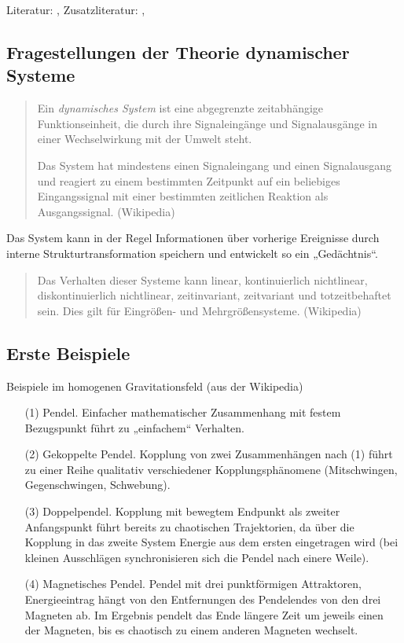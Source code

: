 \documentclass[11pt,a4paper]{article}
\begin{document}
Literatur: \cite{Prigogine1993}, Zusatzliteratur: \cite{Jantsch1992},
\cite{Jooss2017}

\subsection{Fragestellungen der Theorie dynamischer Systeme}
\begin{quote}  
  Ein \emph{dynamisches System} ist eine abgegrenzte zeitabhängige
  Funktionseinheit, die durch ihre Signaleingänge und Signalausgänge in einer
  Wechselwirkung mit der Umwelt steht. 

  Das System hat mindestens einen Signaleingang und einen Signalausgang und
  reagiert zu einem bestimmten Zeitpunkt auf ein beliebiges Eingangssignal mit
  einer bestimmten zeitlichen Reaktion als Ausgangssignal. (Wikipedia)
\end{quote}
Das System kann in der Regel Informationen über vorherige Ereignisse durch
interne Strukturtransformation speichern und entwickelt so ein „Gedächtnis“.
\begin{quote}
  Das Verhalten dieser Systeme kann linear, kontinuierlich nichtlinear,
  diskontinuierlich nichtlinear, zeitinvariant, zeitvariant und
  totzeitbehaftet sein. Dies gilt für Eingrößen- und Mehrgrößensysteme.
  (Wikipedia)
\end{quote}

\subsection{Erste Beispiele}

Beispiele im homogenen Gravitationsfeld (aus der Wikipedia)
\begin{itemize}
\item[(1)] Pendel. Einfacher mathematischer Zusammenhang mit festem
  Bezugspunkt führt zu „einfachem“ Verhalten.
\item[(2)] Gekoppelte Pendel. Kopplung von zwei Zusammenhängen nach (1) führt
  zu einer Reihe qualitativ verschiedener Kopplungsphänomene (Mitschwingen,
  Gegenschwingen, Schwebung).
\item[(3)] Doppelpendel.  Kopplung mit bewegtem Endpunkt als zweiter
  Anfangspunkt führt bereits zu chaotischen Trajektorien, da über die Kopplung
  in das zweite System Energie aus dem ersten eingetragen wird (bei kleinen
  Ausschlägen synchronisieren sich die Pendel nach einere Weile).
\item[(4)] Magnetisches Pendel. Pendel mit drei punktförmigen Attraktoren,
  Energieeintrag hängt von den Entfernungen des Pendelendes von den drei
  Magneten ab. Im Ergebnis pendelt das Ende längere Zeit um jeweils einen der
  Magneten, bis es chaotisch zu einem anderen Magneten wechselt.
\end{itemize}
\end{document}
